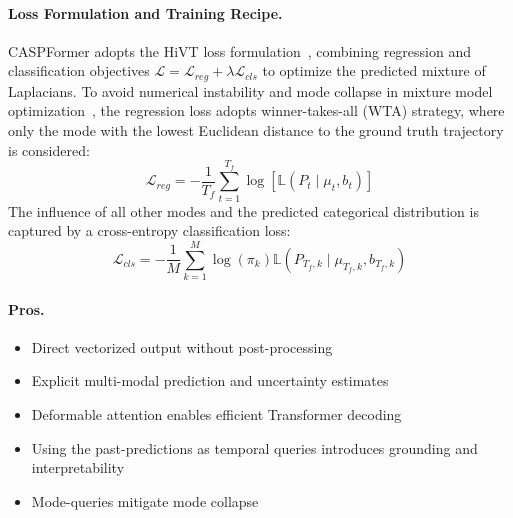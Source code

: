 \begin{description}[leftmargin=1em,itemsep=2pt]
\paragraph{Loss Formulation and Training Recipe.}
\label{par:casp_loss_formulation}
CASPFormer adopts the HiVT loss formulation~\cite{zhou2022hivt}, combining regression and classification objectives \(\mathcal{L} = \mathcal{L}_{reg} + \lambda \mathcal{L}_{cls}\) to optimize the predicted mixture of Laplacians.
To avoid numerical instability and mode collapse in mixture model optimization~\cite{rupprecht2017learning}, the regression loss adopts winner-takes-all (WTA) strategy, where only the mode with the lowest Euclidean distance to the ground truth trajectory is considered:
\begin{equation}
  \label{eq:caspformer_regression_loss}
  \mathcal{L}_{reg} = -\frac{1}{T_f} \sum_{t=1}^{T_f} \log[\mathbb{L}(P_t \mid \mu_t, b_t)]
\end{equation}
The influence of all other modes and the predicted categorical distribution is captured by a cross-entropy classification loss:
\begin{equation}
  \label{eq:caspformer_classification_loss}
  \mathcal{L}_{cls} = -\frac{1}{M} \sum_{k=1}^{M} \log(\pi_k) \mathbb{L}(P_{T_f, k} \mid \mu_{T_f, k}, b_{T_f, k})
\end{equation}
\end{description}

\paragraph{Pros.}
\begin{itemize}[leftmargin=*, label=\greenoplus]
  \item Direct vectorized output without post-processing
  \item Explicit multi-modal prediction and uncertainty estimates
  \item Deformable attention enables efficient Transformer decoding
  \item Using the past-predictions as temporal queries introduces grounding and interpretability
  \item Mode-queries mitigate mode collapse
\end{itemize}

